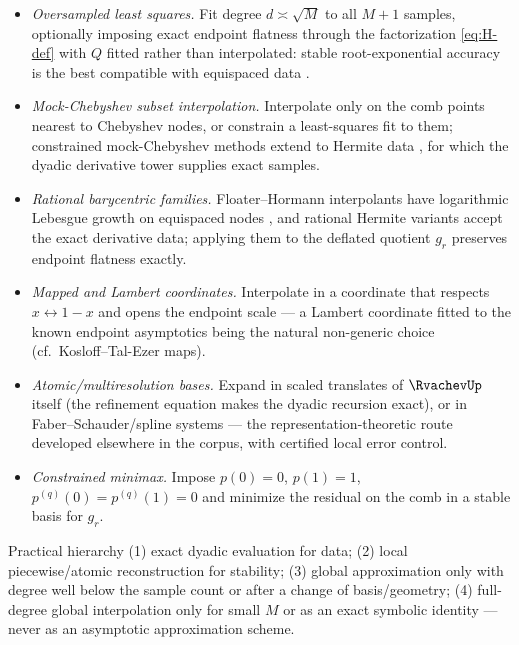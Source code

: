 \begin{itemize}
\item\emph{Oversampled least squares.}  Fit degree $d\asymp\sqrt M$
to all $M+1$ samples, optionally imposing exact endpoint flatness
through the factorization \eqref{eq:H-def} with $Q$ fitted rather
than interpolated: stable root-exponential accuracy is the best
compatible with equispaced data
\cite{PlatteTrefethenKuijlaars2011,AdcockShadrin2023}.
\item\emph{Mock-Chebyshev subset interpolation.}  Interpolate only on
the comb points nearest to Chebyshev nodes, or constrain a
least-squares fit to them; constrained mock-Chebyshev methods extend
to Hermite data \cite{DellAccio2025}, for which the dyadic derivative
tower supplies exact samples.
\item\emph{Rational barycentric families.}  Floater--Hormann
interpolants have logarithmic Lebesgue growth on equispaced nodes
\cite{FloaterHormann2007,CirilloHormann2019}, and rational Hermite
variants accept the exact derivative data; applying them to the
deflated quotient $g_r$ preserves endpoint flatness exactly.
\item\emph{Mapped and Lambert coordinates.}  Interpolate in a
coordinate that respects $x\leftrightarrow1-x$ and opens the
endpoint scale --- a Lambert coordinate fitted to the known endpoint
asymptotics being the natural non-generic choice
(cf.\ Kosloff--Tal-Ezer maps).
\item\emph{Atomic/multiresolution bases.}  Expand in scaled
translates of $\RvachevUp$ itself (the refinement equation makes the dyadic
recursion exact), or in Faber--Schauder/spline systems --- the
representation-theoretic route developed elsewhere in the corpus,
with certified local error control.
\item\emph{Constrained minimax.}  Impose
$p(0)=0$, $p(1)=1$, $p^{(q)}(0)=p^{(q)}(1)=0$ and minimize the
residual on the comb in a stable basis for $g_r$.
\end{itemize}

\begin{statusbox}{Practical hierarchy}
(1) exact dyadic evaluation for data;
(2) local piecewise/atomic reconstruction for stability;
(3) global approximation only with degree well below the sample count
or after a change of basis/geometry;
(4) full-degree global interpolation only for small $M$ or as an
exact symbolic identity --- never as an asymptotic approximation
scheme.
\end{statusbox}

